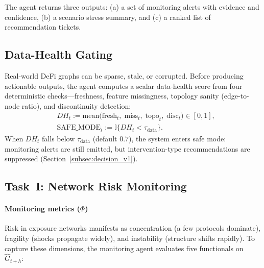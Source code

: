 The agent returns three outputs: (a) a set of monitoring alerts with evidence and confidence, (b) a scenario stress summary, and (c) a ranked list of recommendation tickets.

\subsection{Data-Health Gating}
\label{subsec:data_health_gate}
Real-world DeFi graphs can be sparse, stale, or corrupted. Before producing actionable outputs, the agent computes a scalar data-health score from four deterministic checks---freshness, feature missingness, topology sanity (edge-to-node ratio), and discontinuity detection:
\begin{align}
\label{eq:data_health}
&DH_t := \mathrm{mean}\bigl(\mathrm{fresh}_t,\;\mathrm{miss}_t,\;\mathrm{topo}_t,\;\mathrm{disc}_t\bigr)\in[0,1],\nonumber\\
&\mathrm{SAFE\_MODE}_t := \mathbb{I}\{DH_t<\tau_{\mathrm{data}}\}.
\end{align}
When $DH_t$ falls below $\tau_{\mathrm{data}}$ (default $0.7$), the system enters safe mode: monitoring alerts are still emitted, but intervention-type recommendations are suppressed (Section~\ref{subsec:decision_v1}).

\subsection{Task~I: Network Risk Monitoring}
\label{subsec:task_monitoring}

\paragraph{Monitoring metrics ($\Phi$)}
Risk in exposure networks manifests as concentration (a few protocols dominate), fragility (shocks propagate widely), and instability (structure shifts rapidly). To capture these dimensions, the monitoring agent evaluates five functionals on $\widehat{G}_{t+h}$:

